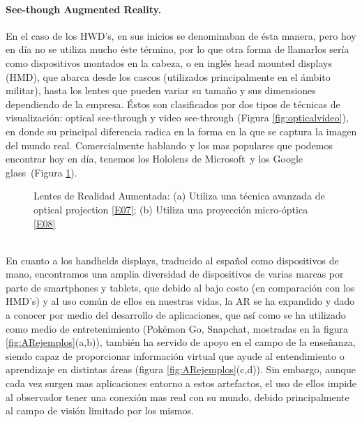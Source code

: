 \documentclass[a4paper,openright,12pt]{report}
\begin{document}
\paragraph{See-though Augmented Reality.}
En el caso de los HWD's, en sus inicios se denominaban de ésta manera, pero hoy en día no se utiliza mucho éste término, por lo que otra forma de llamarlos sería como dispositivos montados en la cabeza, o en inglés head mounted displays (HMD), que abarca desde los cascos (utilizados principalmente en el ámbito militar), hasta los lentes que pueden variar su tamaño y sus dimensiones dependiendo de la empresa. Éstos son clasificados por dos tipos de técnicas de visualización: optical see-through y video see-through (Figura \ref{fig:opticalvideo}), en donde su principal diferencia radica en la forma en la que se captura la imagen del mundo real. Comercialmente hablando y los mas populares que podemos encontrar hoy en día, tenemos los Hololens de Microsoft\textcopyright\ y los Google glass\textcopyright\ (Figura \ref{fig:lentesAR}).
\begin{figure}[thbp]
	\centering
	\caption[Lentes de Realidad Aumentada]{Lentes de Realidad Aumentada: (a) Utiliza una técnica avanzada de optical projection \hyperlink{e07}{[E07]}; (b) Utiliza una proyección micro-óptica \hyperlink{e08}{[E08]}} \label{fig:lentesAR}
\end{figure}\\
En cuanto a los handhelds displays, traducido al español como dispositivos de mano, encontramos una amplia diversidad de dispositivos de varias marcas por parte de smartphones y tablets, que debido al bajo costo (en comparación con los HMD's) y al uso común de ellos en nuestras vidas, la AR se ha expandido y dado a conocer por medio del desarrollo de aplicaciones, que así como se ha utilizado como medio de entretenimiento (Pokémon Go\textcopyright, Snapchat\textcopyright, mostradas en la figura \ref{fig:ARejemplos}(a,b)), también ha servido de apoyo en el campo de la enseñanza, siendo capaz de proporcionar información virtual que ayude al entendimiento o aprendizaje en distintas áreas (figura \ref{fig:ARejemplos}(c,d)). Sin embargo, aunque cada vez surgen mas aplicaciones entorno a estos artefactos, el uso de ellos impide al observador tener una conexión mas real con su mundo, debido principalmente al campo de visión limitado por los mismos.\\
\end{document}
